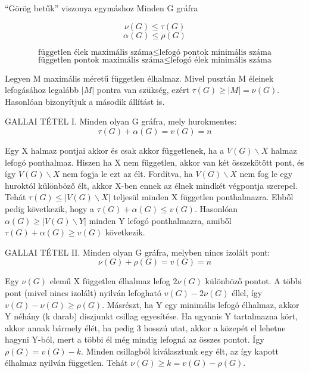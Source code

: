 \begin{tetel}{``Görög betűk'' viszonya egymáshoz}
  Minden G gráfra
  
  \begin{minipage}{0.2\textwidth}
    $$\nu(G) \leq \tau(G)$$
    $$\alpha(G) \leq \rho(G)$$
  \end{minipage}
  \begin{minipage}{0.6\textwidth}
    $$\text{független élek maximális száma} \leq \text{lefogó pontok minimális száma}$$
    $$\text{független pontok maximális száma} \leq \text{lefogó élek minimális száma}$$
  \end{minipage}
\end{tetel}

\begin{bizonyitas}{}
Legyen M maximális méretű független élhalmaz. Mivel pusztán M éleinek lefogásához legalább $|M|$ pontra van szükség, ezért $\tau(G) \geq |M| = \nu(G)$.
Hasonlóan bizonyítjuk a második állítást is.
\end{bizonyitas}

\begin{tetel}{GALLAI TÉTEL I.}
Minden olyan G gráfra, mely hurokmentes:
$$\tau(G) + \alpha(G) = v(G) = n$$
\end{tetel}

\begin{bizonyitas}{}
Egy X halmaz pontjai akkor és csak akkor függetlenek, ha a $V(G)\backslash X$ halmaz lefogó ponthalmaz. Hiszen ha X nem független, akkor van két összekötött pont, és így $V(G)\backslash X$ nem fogja le ezt az élt. Fordítva, ha $V(G)\backslash X$ nem fog le egy huroktól különböző élt, akkor X-ben ennek az élnek mindkét végpontja szerepel. Tehát $\tau(G) \leq |V(G)\backslash X|$ teljesül minden X független ponthalmazra. Ebből pedig következik, hogy a $\tau(G) + \alpha(G) \leq v(G)$. Hasonlóan $\alpha(G) \geq |V(G) \backslash Y|$ minden Y lefogó ponthalmazra, amiből $\tau(G) + \alpha(G) \geq v(G)$ következik.
\end{bizonyitas}

\begin{tetel}{GALLAI TÉTEL II.}
Minden olyan G gráfra, melyben nincs izolált pont:
$$\nu(G) + \rho(G) = v(G) = n$$
\end{tetel}

\begin{bizonyitas}{}
Egy $\nu(G)$ elemű X független élhalmaz lefog $2\nu(G)$ különböző pontot. A többi pont (mivel nincs izolált) nyilván lefogható $v(G) - 2\nu(G)$ éllel, így $v(G) - \nu(G) \geq \rho(G)$. Másrészt, ha Y egy minimális lefogó élhalmaz, akkor Y néhány (k darab) diszjunkt csillag egyesítése. Ha ugyanis Y tartalmazna kört, akkor annak bármely élét, ha pedig 3 hosszú utat, akkor a közepét el lehetne hagyni Y-ból, mert a többi él még mindig lefogná az összes pontot. Így $\rho(G) = v(G) - k$. Minden csillagból kiválasztunk egy élt, az így kapott élhalmaz nyilván független. Tehát $\nu(G) \geq k = v(G) - \rho(G)$.
\end{bizonyitas}


